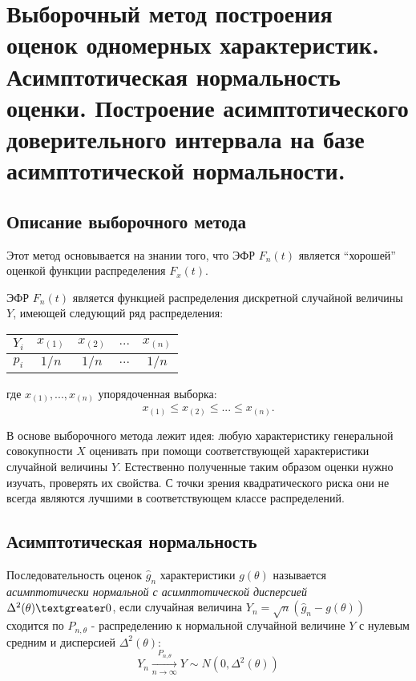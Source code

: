 \section{Выборочный метод построения оценок одномерных характеристик.
    Асимптотическая нормальность оценки. Построение асимптотического доверительного
интервала на базе асимптотической нормальности.}
\subsection{Описание выборочного метода}
Этот метод основывается на знании того, что ЭФР $F_n(t)$ является ``хорошей''
оценкой функции распределения $F_x(t)$.

ЭФР $F_n(t)$ является функцией распределения дискретной случайной величины
$Y$, имеющей следующий ряд распределения:


\begin{center}
    \begin{tabular}{ c|c|c|c|c }
        $Y_i$ & $x_{(1)}$ & $x_{(2)}$ & $...$ & $x_{(n)}$ \\
        \hline
        $p_i$ & $1/n$ & $1/n$ & $...$ & $1/n$ \\
    \end{tabular}
\end{center}

где $x_{(1)}, ..., x_{(n)}$ упорядоченная выборка:
\[
    x_{(1)} \leqslant x_{(2)} \leqslant ... \leqslant x_{(n)}
.\]

В основе выборочного метода лежит идея:
любую характеристику генеральной совокупности $X$ оценивать при помощи соответствующей характеристики случайной величины $Y$. Естественно полученные таким образом оценки нужно изучать, проверять их свойства. С точки зрения квадратического риска они не всегда являются лучшими в соответствующем классе распределений.

\subsection{Асимптотическая нормальность}

\begin{definition}
    Последовательность оценок $\hat{g}_n$ характеристики $g(\theta)$ называется
    \textit{асимптотически нормальной с асимптотической дисперсией}
    $\Delta^2(\theta)
    \textgreater 0$, если случайная величина $Y_n = \sqrt{n}(\hat{g}_n -
    g(\theta))$ сходится по $P_{n, \theta}$ - распределению к нормальной
    случайной величине $Y$ с нулевым средним и дисперсией $\Delta^2(\theta)$:
    \begin{equation}
        Y_n \xrightarrow[n \to \infty]{P_{n, \theta}} Y \sim
        N(0, \Delta^2(\theta))\label{eq:1}
    \end{equation}
\end{definition}

